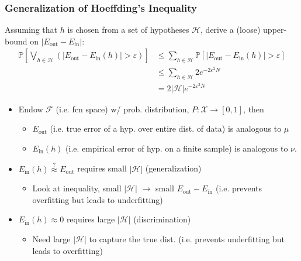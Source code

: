 \subsubsection{Generalization of Hoeffding's Inequality}
\begin{definition}
    Assuming that $h$ is chosen from a set of hypotheses $\mathcal{H}$, derive a (loose) upper-bound on $|E_{\text{out}} - E_{\text{in}}|$:
    \begin{align*}
        \mathbb{P} \left[ \bigvee_{h \in \mathcal{H}} \left( |E_{\text{out}} - E_{\text{in}}(h)| > \varepsilon \right) \right]
        &\leq \sum_{h \in \mathcal{H}} \mathbb{P} \left[ |E_{\text{out}} - E_{\text{in}}(h)| > \varepsilon \right] \\
        &\leq \sum_{h \in \mathcal{H}} 2e^{-2\varepsilon^2 N} \\
        &= 2 |\mathcal{H}| e^{-2\varepsilon^2 N} 
    \end{align*}
    \begin{itemize}
        \item Endow $\mathcal{F}$ (i.e. fcn space) w/ prob. distribution, $P : \mathcal{X} \to [0,1]$, then 
        \begin{itemize}
            \item $E_{\text{out}}$ (i.e. true error of a hyp. over entire dist. of data) is analogous to $\mu$ 
            \item $E_{\text{in}}(h)$ (i.e. empirical error of hyp. on a finite sample) is analogous to $\nu$. 
        \end{itemize}
    \end{itemize}
\end{definition}

\begin{notes}
    \begin{itemize}
        \item $E_{\text{in}}(h) \stackrel{?}{\approx} E_{\text{out}}$ requires small $|\mathcal{H}|$ (generalization)
        \begin{itemize}
            \item Look at inequality, small $|\mathcal{H}|$ $\rightarrow$ small $E_{\text{out}} - E_{\text{in}}$ (i.e. prevents overfitting but leads to underfitting)
        \end{itemize}
        \item $E_{\text{in}}(h) \approx 0$ requires large $|\mathcal{H}|$ (discrimination)
        \begin{itemize}
            \item Need large $|\mathcal{H}|$ to capture the true dist. (i.e. prevents underfitting but leads to overfitting)
        \end{itemize}
    \end{itemize}
\end{notes}
\newpage

